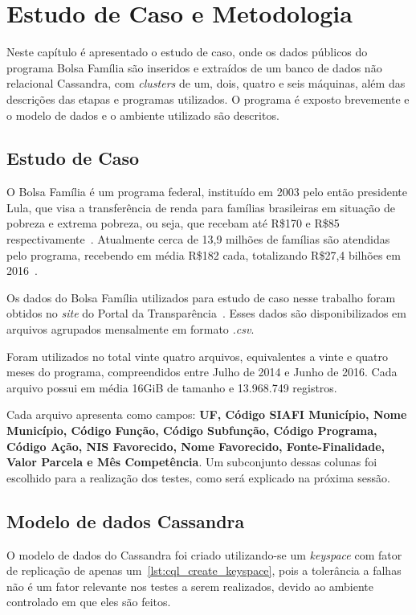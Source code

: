 

\chapter{Estudo de Caso e Metodologia}

Neste capítulo é apresentado o estudo de caso, onde os dados públicos do programa Bolsa Família são inseridos e extraídos de um banco de dados não relacional Cassandra, com \emph{clusters} de um, dois, quatro e seis máquinas, além das descrições das etapas e programas utilizados. O programa é exposto brevemente e o modelo de dados e o ambiente utilizado são descritos.

\section{Estudo de Caso}
O Bolsa Família é um programa federal, instituído em 2003 pelo então presidente Lula, que visa a transferência de renda para famílias brasileiras em situação de pobreza e extrema pobreza, ou seja, que recebam até R\$170 e R\$85 respectivamente~\cite{caixa-bolsafamilia}. Atualmente cerca de 13,9 milhões de famílias são atendidas pelo programa, recebendo em média R\$182 cada, totalizando R\$27,4 bilhões em 2016~\cite{gov-bolsafamilia1, gov-bolsafamilia2}.

Os dados do Bolsa Família utilizados para estudo de caso nesse trabalho foram obtidos no \emph{site} do Portal da Transparência~\cite{portaldatransparencia}. Esses dados são disponibilizados em arquivos agrupados mensalmente em formato \emph{.csv}. 

Foram utilizados no total vinte quatro arquivos, equivalentes a vinte e quatro meses do programa, compreendidos entre Julho de 2014 e Junho de 2016. Cada arquivo possui em média 16GiB de tamanho e 13.968.749 registros.

Cada arquivo apresenta como campos: \textbf{UF, Código SIAFI Município, Nome Município, Código Função, Código Subfunção, Código Programa, Código Ação, NIS Favorecido, Nome Favorecido, Fonte-Finalidade, Valor Parcela e Mês Competência}. Um subconjunto dessas colunas foi escolhido para a realização dos testes, como será explicado na próxima sessão.

\section{Modelo de dados Cassandra}
O modelo de dados do Cassandra foi criado utilizando-se um \emph{keyspace} com fator de replicação de apenas um~\ref{lst:cql_create_keyspace}, pois a tolerância a falhas não é um fator relevante nos testes a serem realizados, devido ao ambiente controlado em que eles são feitos.

